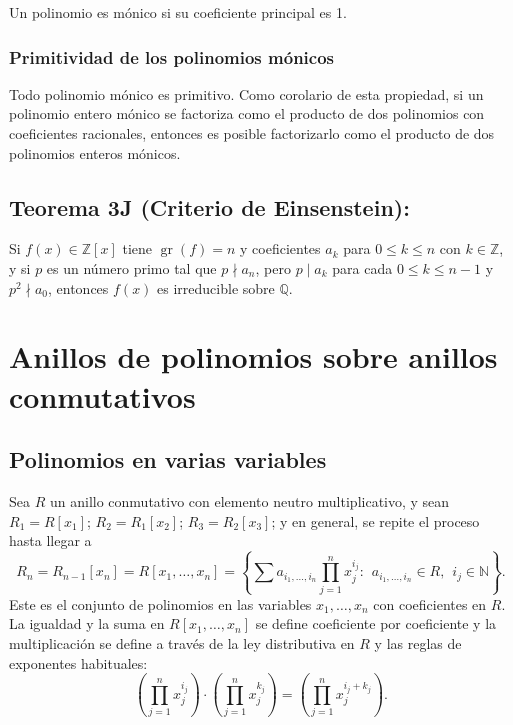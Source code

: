 \documentclass{article}
\DeclareMathOperator{\gr}{gr}
\begin{document}
Un polinomio es mónico si su coeficiente principal es 1.

\subsubsection*{\color{purple} Primitividad de los polinomios mónicos}

Todo polinomio mónico es primitivo. Como corolario de esta propiedad, si un polinomio entero mónico se factoriza como el producto de dos polinomios con coeficientes racionales, entonces es posible factorizarlo como el producto de dos polinomios enteros mónicos.

\subsection*{\color{red} Teorema 3J (Criterio de Einsenstein):}

Si $f(x)\in\mathbb{Z}[x]$ tiene $\gr(f)=n$ y coeficientes $a_k$ para $0\leq k\leq n$ con $k\in\mathbb{Z}$, y si $p$ es un número primo tal que $p\nmid a_n$, pero $p\mid a_{k}$ para cada $0\leq k\leq n-1$ y $p^2\nmid a_0$, entonces $f(x)$ es irreducible sobre $\mathbb{Q}$. 

\newpage
\section{Anillos de polinomios sobre anillos conmutativos}

\subsection*{\color{violet} Polinomios en varias variables}

Sea $R$ un anillo conmutativo con elemento neutro multiplicativo, y sean $R_1=R[x_1]$; $R_2=R_1[x_2]$; $R_3=R_2[x_3]$; y en general, se repite el proceso hasta llegar a 
$$R_n=R_{n-1}[x_n]=R[x_1,\ldots,x_n]=\left\{\sum a_{i_1,\ldots,i_n}\prod_{j=1}^n x_j^{i_j}: \hspace{5pt}a_{i_1,\ldots,i_n}\in R,\hspace{5pt} i_j\in \mathbb{N}\right\}.$$
Este es el conjunto de polinomios en las variables $x_1,\ldots,x_n$ con coeficientes en $R$. La igualdad y la suma en $R[x_1,\ldots,x_n]$ se define coeficiente por coeficiente y la multiplicación se define a través de la ley distributiva en $R$ y las reglas de exponentes habituales:
$$\left(\prod_{j=1}^n x_j^{i_j}\right)\cdot \left(\prod_{j=1}^n x_j^{k_j}\right)=\left(\prod_{j=1}^n x_j^{i_j+k_j}\right).$$
\end{document}
